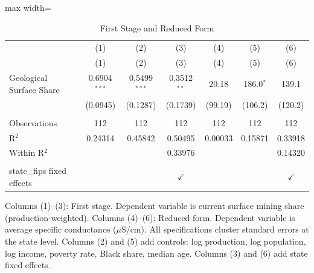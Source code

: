 
\begin{table}[htbp]
   \caption{\label{tab:first_stage} First Stage and Reduced Form}
   \bigskip
   \centering
   \footnotesize
   \begin{adjustbox}{max width=\textwidth}
   \begin{tabular}{lcccccc}
      \toprule
                                 & (1)            & (2)            & (3)           & (4)     & (5)         & (6) \\   
                                 & (1)            & (2)            & (3)           & (4)     & (5)         & (6)\\  
      \midrule 
      Geological Surface Share   & 0.6904$^{***}$ & 0.5499$^{***}$ & 0.3512$^{**}$ & 20.18   & 186.0$^{*}$ & 139.1\\   
                                 & (0.0945)       & (0.1287)       & (0.1739)      & (99.19) & (106.2)     & (120.2)\\   
       \\
      Observations               & 112            & 112            & 112           & 112     & 112         & 112\\  
      R$^2$                      & 0.24314        & 0.45842        & 0.50495       & 0.00033 & 0.15871     & 0.33918\\  
      Within R$^2$               &                &                & 0.33976       &         &             & 0.14320\\  
       \\
      state\_fips fixed effects  &                &                & $\checkmark$  &         &             & $\checkmark$\\   
      \bottomrule
   \end{tabular}
   \end{adjustbox}

   \par \raggedright 
   Columns (1)--(3): First stage. Dependent variable is current surface mining share (production-weighted). Columns (4)--(6): Reduced form. Dependent variable is average specific conductance ($\mu$S/cm). All specifications cluster standard errors at the state level. Columns (2) and (5) add controls: log production, log population, log income, poverty rate, Black share, median age. Columns (3) and (6) add state fixed effects.
\end{table}


